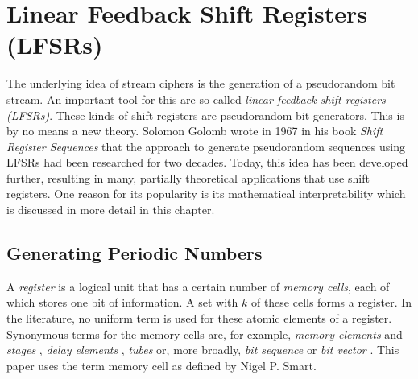 \section{Linear Feedback Shift Registers (LFSRs)}
The underlying idea of stream ciphers is the generation of a pseudorandom bit stream. An important tool for this are so called \textit{linear feedback shift registers (LFSRs)}. These kinds of shift registers are pseudorandom bit generators. This is by no means a new theory. Solomon Golomb wrote in 1967 in his book \textit{Shift Register Sequences} that the approach to generate pseudorandom sequences using LFSRs had been researched for two decades. \cite[p. 2]{Golomb.1967} Today, this idea has been developed further, resulting in many, partially theoretical applications that use shift registers. One reason for its popularity is its mathematical interpretability which is discussed in more detail in this chapter. 

\subsection{Generating Periodic Numbers}
A \textit{register} is a logical unit that has a certain number of \textit{memory cells}, each of which stores one bit of information. A set with $k$ of these cells forms a register. In the literature, no uniform term is used for these atomic elements of a register. Synonymous terms for the memory cells are, for example, \textit{memory elements} and \textit{stages} \cite[p. 81]{Stamp.2007}, \textit{delay elements} \cite[pp. 186-187]{Lidl.1986}, \textit{tubes} \cite[p. 27]{Golomb.1967} or, more broadly, \textit{bit sequence} \cite[p. 429]{Schneier.2006} or \textit{bit vector} \cite[p. 198]{Ertel.2020}. This paper uses the term memory cell as defined by Nigel P. Smart. \cite[p. 227]{Smart.2016} \\

